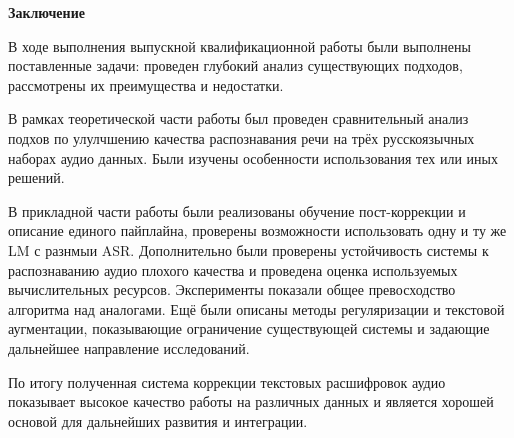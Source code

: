 \newpage
\begin{center}
  \textbf{\large Заключение}
\end{center}


В ходе выполнения выпускной квалификационной работы были выполнены поставленные задачи: проведен глубокий анализ существующих подходов, рассмотрены их преимущества и недостатки.

В рамках теоретической части работы был проведен сравнительный анализ подхов по улулчшению качества распознавания речи на трёх русскоязычных наборах аудио данных.
Были изучены особенности использования тех или иных решений.

В прикладной части работы были реализованы обучение пост-коррекции и описание единого пайплайна, проверены возможности использовать одну и ту же LM с разнмыи ASR.
Дополнительно были проверены устойчивость системы к распознаванию аудио плохого качества и проведена оценка используемых вычислительных ресурсов.
Эксперименты показали общее превосходство алгоритма над аналогами.
Ещё были описаны методы регуляризации и текстовой аугментации, показывающие ограничение существующей системы и задающие дальнейшее направление исследований.

По итогу полученная система коррекции текстовых расшифровок аудио показывает высокое качество работы на различных данных и является хорошей основой для дальнейших развития и интеграции.
